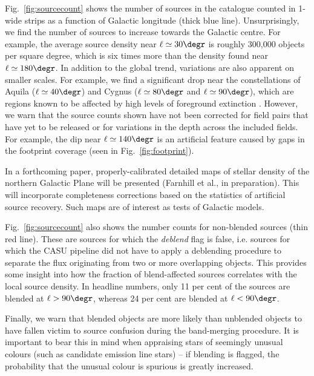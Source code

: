 \documentclass[a4paper,useAMS,usenatbib]{mn2e}
\begin{document}
Fig.~\ref{fig:sourcecount} shows the number of sources
in the catalogue counted in 1\degr-wide strips
as a function of Galactic longitude (thick blue line).	
Unsurprisingly, we find the number of sources
to increase towards the Galactic centre.
For example, the average source density near $\ell\simeq 30\degr$
is roughly 300,000 objects per square degree,
which is six times more than the density
found near $\ell\simeq 180\degr$.
In addition to the global trend,
variations are also apparent on smaller scales.
For example, we find a significant drop near the constellations 
of Aquila ($\ell\simeq40\degr$) and Cygnus ($\ell\simeq80\degr$ and $\ell\simeq90\degr$),
which are regions known to be affected
by high levels of foreground extinction
\citep[the extremities of `the Great Rift', e.g.][]{BokBok}.
However, we warn that the source counts shown 
have not been corrected for field pairs that have yet
to be released or for variations in the depth across the included fields.
For example, the dip near $\ell\simeq140\degr$
is an artificial feature caused by gaps
in the footprint coverage (seen in Fig.~\ref{fig:footprint}).

In a forthcoming paper, properly-calibrated detailed maps of stellar density
of the northern Galactic Plane will be presented (Farnhill
et al., in preparation).  This will incorporate completeness
corrections based on the statistics of artificial source
recovery.  Such maps are of interest as tests of Galactic models.

Fig.~\ref{fig:sourcecount} also shows the number counts
for non-blended sources (thin red line).
These are sources for which the \emph{deblend} flag is {\sc false},
i.e. sources for which the CASU pipeline did not have to apply 
a deblending procedure to separate the flux
originating from two or more overlapping objects.
This provides some insight into how the fraction of 
blend-affected sources correlates with the local source 
density.  In headline numbers, only 11 per cent of the sources are blended
at $\ell>90\degr$, whereas 24 per cent are blended at $\ell<90\degr$.

Finally, we warn that blended objects
are more likely than unblended objects to have fallen victim
to source confusion during the band-merging procedure.  It is
important to bear this in mind when appraising stars of seemingly
unusual colours (such as candidate emission line stars) -- if 
blending is flagged, the probability that the unusual colour is 
spurious is greatly increased.

\end{document}
